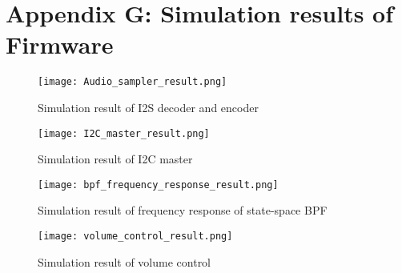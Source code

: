 \chapter*{Appendix G: Simulation results of Firmware}
\label{chap:appendix-G-simulation-results}

\begin{figure}[!ht]
    \texttt{[image: Audio\_sampler\_result.png]}
    \caption{Simulation result of I2S decoder and encoder}
    \label{fig:sim_result_i2s_dec_enc}
\end{figure}

\begin{figure}[!ht]
    \texttt{[image: I2C\_master\_result.png]}
    \caption{Simulation result of I2C master}
    \label{fig:sim_result_i2c-master}
\end{figure}

\begin{figure}[!ht]
    \texttt{[image: bpf\_frequency\_response\_result.png]}
    \caption{Simulation result of frequency response of state-space BPF}
    \label{fig:sim_result_bpf}
\end{figure}

\begin{figure}[!ht]
    \texttt{[image: volume\_control\_result.png]}
    \caption{Simulation result of volume control}
    \label{fig:sim_result_vol_ctrl}
\end{figure}

